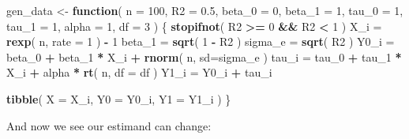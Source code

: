 \documentclass[
]{book}
\newenvironment{Shaded}{\begin{snugshade}}{\end{snugshade}}
\newcommand{\AttributeTok}[1]{\textcolor[rgb]{0.13,0.29,0.53}{#1}}
\newcommand{\ControlFlowTok}[1]{\textcolor[rgb]{0.13,0.29,0.53}{\textbf{#1}}}
\newcommand{\DecValTok}[1]{\textcolor[rgb]{0.00,0.00,0.81}{#1}}
\newcommand{\FloatTok}[1]{\textcolor[rgb]{0.00,0.00,0.81}{#1}}
\newcommand{\FunctionTok}[1]{\textcolor[rgb]{0.13,0.29,0.53}{\textbf{#1}}}
\newcommand{\NormalTok}[1]{#1}
\newcommand{\OtherTok}[1]{\textcolor[rgb]{0.56,0.35,0.01}{#1}}
\newcommand{\SpecialCharTok}[1]{\textcolor[rgb]{0.81,0.36,0.00}{\textbf{#1}}}
\begin{document}
\begin{Shaded}
\begin{Highlighting}[]
\NormalTok{gen\_data }\OtherTok{\textless{}{-}} \ControlFlowTok{function}\NormalTok{( }\AttributeTok{n =} \DecValTok{100}\NormalTok{,}
                      \AttributeTok{R2 =} \FloatTok{0.5}\NormalTok{,}
                      \AttributeTok{beta\_0 =} \DecValTok{0}\NormalTok{, }\AttributeTok{beta\_1 =} \DecValTok{1}\NormalTok{,}
                      \AttributeTok{tau\_0 =} \DecValTok{1}\NormalTok{, }\AttributeTok{tau\_1 =} \DecValTok{1}\NormalTok{, }
                      \AttributeTok{alpha =} \DecValTok{1}\NormalTok{, }\AttributeTok{df =} \DecValTok{3}\NormalTok{ ) \{}
  \FunctionTok{stopifnot}\NormalTok{( R2 }\SpecialCharTok{\textgreater{}=} \DecValTok{0} \SpecialCharTok{\&\&}\NormalTok{ R2 }\SpecialCharTok{\textless{}} \DecValTok{1}\NormalTok{ )}
\NormalTok{  X\_i }\OtherTok{=} \FunctionTok{rexp}\NormalTok{( n, }\AttributeTok{rate =} \DecValTok{1}\NormalTok{ ) }\SpecialCharTok{{-}} \DecValTok{1}
\NormalTok{  beta\_1 }\OtherTok{=} \FunctionTok{sqrt}\NormalTok{( }\DecValTok{1} \SpecialCharTok{{-}}\NormalTok{ R2 )}
\NormalTok{  sigma\_e }\OtherTok{=} \FunctionTok{sqrt}\NormalTok{( R2 )}
\NormalTok{  Y0\_i }\OtherTok{=}\NormalTok{ beta\_0 }\SpecialCharTok{+}\NormalTok{ beta\_1 }\SpecialCharTok{*}\NormalTok{ X\_i }\SpecialCharTok{+} \FunctionTok{rnorm}\NormalTok{( n, }\AttributeTok{sd=}\NormalTok{sigma\_e )}
\NormalTok{  tau\_i }\OtherTok{=}\NormalTok{ tau\_0 }\SpecialCharTok{+}\NormalTok{ tau\_1 }\SpecialCharTok{*}\NormalTok{ X\_i }\SpecialCharTok{+}\NormalTok{ alpha }\SpecialCharTok{*} \FunctionTok{rt}\NormalTok{( n, }\AttributeTok{df =}\NormalTok{ df )}
\NormalTok{  Y1\_i }\OtherTok{=}\NormalTok{ Y0\_i }\SpecialCharTok{+}\NormalTok{ tau\_i}
  
  \FunctionTok{tibble}\NormalTok{( }\AttributeTok{X =}\NormalTok{ X\_i, }\AttributeTok{Y0 =}\NormalTok{ Y0\_i, }\AttributeTok{Y1 =}\NormalTok{ Y1\_i )}
\NormalTok{\}}
\end{Highlighting}
\end{Shaded}

And now we see our estimand can change:

\begin{Shaded}
\end{Shaded}
\end{document}

